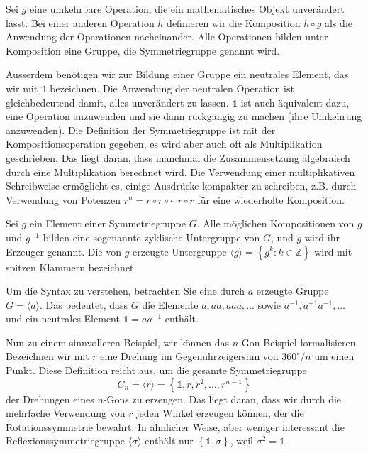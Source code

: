 \begin{definition}[Symmetriegruppe]
	Sei \(g\) eine umkehrbare Operation, die ein mathematisches Objekt
	unverändert lässt.  Bei einer anderen Operation \(h\) definieren wir die
	Komposition \(h\circ g\) als die Anwendung der Operationen nacheinander. Alle
	Operationen bilden unter Komposition eine Gruppe, die Symmetriegruppe genannt
	wird.
\end{definition} %

Ausserdem benötigen wir zur Bildung einer Gruppe ein neutrales Element, das wir
mit \(\mathds{1}\) bezeichnen. Die Anwendung der neutralen Operation ist
gleichbedeutend damit, alles unverändert zu lassen. \(\mathds{1}\) ist auch
äquivalent dazu, eine Operation anzuwenden und sie dann rückgängig zu machen
(ihre Umkehrung anzuwenden).
Die Definition der Symmetriegruppe ist mit der Kompositionsoperation gegeben,
es wird aber auch oft als Multiplikation geschrieben. Das liegt daran, dass
manchmal die Zusammensetzung algebraisch durch eine Multiplikation berechnet
wird. Die Verwendung einer multiplikativen Schreibweise ermöglicht es, einige
Ausdrücke kompakter zu schreiben, z.B. durch Verwendung von Potenzen \(r^n =
r\circ r \circ \cdots r\circ r\) für eine wiederholte Komposition. 

\begin{definition}
	Sei \(g\) ein Element einer Symmetriegruppe \(G\). Alle möglichen
	Kompositionen von \(g\) und \(g^{-1}\) bilden eine sogenannte zyklische
	Untergruppe von \(G\), und \(g\) wird ihr Erzeuger genannt. Die von \(g\)
	erzeugte Untergruppe \(\langle g \rangle = \left\{ g^k : k \in \mathbb{Z}
	\right\}\) wird mit spitzen Klammern bezeichnet.
\end{definition}
\begin{beispiel}
	Um die Syntax zu verstehen, betrachten Sie eine durch \(a\) erzeugte Gruppe
	\(G = \langle a \rangle\).  Das bedeutet, dass \(G\) die Elemente \(a, aa,
	aaa, \ldots\) sowie \(a^{-1}, a^{-1}a^{-1}, \ldots\) und ein neutrales
	Element \(\mathds{1} = aa^{-1}\) enthält.
\end{beispiel}
\begin{beispiel}
	Nun zu einem sinnvolleren Beispiel, wir können das \(n\)-Gon Beispiel
	formalisieren.  Bezeichnen wir mit \(r\) eine Drehung im Gegenuhrzeigersinn
	von \(360^\circ/n\) um einen Punkt.  Diese Definition reicht aus, um die
	gesamte Symmetriegruppe
	\[
		C_n = \langle r \rangle
			= \left\{\mathds{1}, r, r^2, \ldots, r^{n-1}\right\}
	\]
	der Drehungen eines \(n\)-Gons zu erzeugen. Das liegt daran, dass wir durch
	die mehrfache Verwendung von \(r\) jeden Winkel erzeugen k\"onnen, der die
	Rotationssymmetrie bewahrt. In ähnlicher Weise, aber weniger interessant die
	Reflexionssymmetriegruppe \(\langle\sigma\rangle\) enthält nur
	\(\left\{\mathds{1}, \sigma\right\}\), weil \(\sigma^2 = \mathds{1}\).
\end{beispiel}

